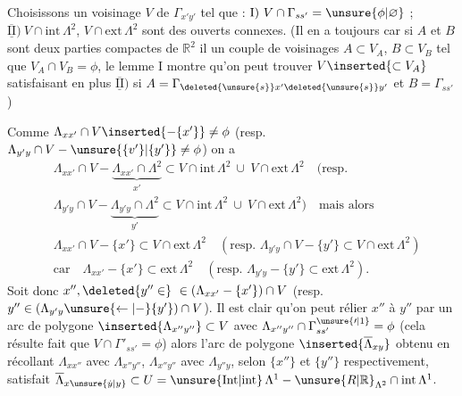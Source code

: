 Choisissons un voisinage $V$ de $\Gamma_{x'y'}$ tel que : $\mathrm{I})\ V\cap\Gamma_{ss'}=\unsure{\phi|\varnothing}$ ;
\reversemarginpar\margin{$\vert$}\normalmarginpar\margin{$\vert$}%
$\overline{\underline{\mathrm{II}}})\ V\cap\mathrm{int}\,\Lambda^{2}$, $V\cap\mathrm{ext}\,\Lambda^{2}$ sont des ouverts connexes. (Il  en a toujours car si $A$ et $B$ sont deux parties compactes de $\mathbb{R}^{2}$ il  un couple de voisinages $A\subset V_A$, $B\subset V_B$ tel que $V_A\cap V_B=\phi$, le lemme I  montre qu'on peut trouver $V\inserted{\subset V_A}$ satisfaisant en plus $\overline{\underline{\mathrm{II}}})$ si $A=\Gamma_{\deleted{\unsure{s}}x'\deleted{\unsure{s}}y'}$ et $B=\Gamma_{ss'}$)

Comme $\Lambda_{xx'}\cap V\inserted{-\{x'\}}\ne\phi$  (resp. $\Lambda_{y'y}\cap V-\unsure{\{v'\}|\{y'\}}\ne\phi$) on a
\[
\begin{aligned}
&\Lambda_{xx'}\cap V-\underbrace{\Lambda_{xx'}\cap\Lambda^{2}}_{x'}\subset V\cap\mathrm{int}\,\Lambda^{2}\ \cup\ V\cap\mathrm{ext}\,\Lambda^{2}\quad(\text{resp.}\\
&\Lambda_{y'y}\cap V-\underbrace{\Lambda_{y'y}\cap\Lambda^{2}}_{y'}\subset V\cap\mathrm{int}\,\Lambda^{2}\ \cup\ V\cap\mathrm{ext}\,\Lambda^{2})\quad\text{mais alors}\\
&\Lambda_{xx'}\cap V-\{x'\}\subset V\cap\mathrm{ext}\,\Lambda^{2}\quad(\text{resp. }\Lambda_{y'y}\cap V-\{y'\}\subset V\cap\mathrm{ext}\,\Lambda^{2})\\
&\text{car}\quad \Lambda_{xx'}-\{x'\}\subset\mathrm{ext}\,\Lambda^{2}\quad(\text{resp. }\Lambda_{y'y}-\{y'\}\subset\mathrm{ext}\,\Lambda^{2}).
\end{aligned}
\]
Soit donc $x'',\deleted{y''\in}\ \in(\Lambda_{xx'}-\{x'\})\cap V$ (resp. $y''\in(\Lambda_{y'y}\unsure{\leftarrow|-}\{y'\})\cap V$).
Il est clair qu'on peut rélier $x''$ à $y''$ par un arc de polygone $\inserted{\Lambda_{x''y''}}\subset V$ avec $\Lambda_{x''y''}\cap\Gamma^{\unsure{\prime|1}}_{ss'}=\phi$ (cela résulte  fait que $V\cap\Gamma'_{ss'}=\phi$) alors l'arc de polygone $\inserted{\overline{\Lambda}_{xy}}$ obtenu
\reversemarginpar\margin{$\vert$}\normalmarginpar\margin{$\vert$}%
en récollant $\Lambda_{xx''}$ avec $\Lambda_{x''y''}$, $\Lambda_{x''y''}$ avec $\Lambda_{y''y}$, selon $\{x''\}$ et $\{y''\}$ respectivement, satisfait $\overline{\Lambda}_{x\unsure{\dot y|y}}\subset U=\unsure{\mathrm{Int}|\mathrm{int}}\,\Lambda^{1}-\unsure{R|\mathbb{R}}_{\Lambda^{2}}\cap\mathrm{int}\,\Lambda^{1}$.

